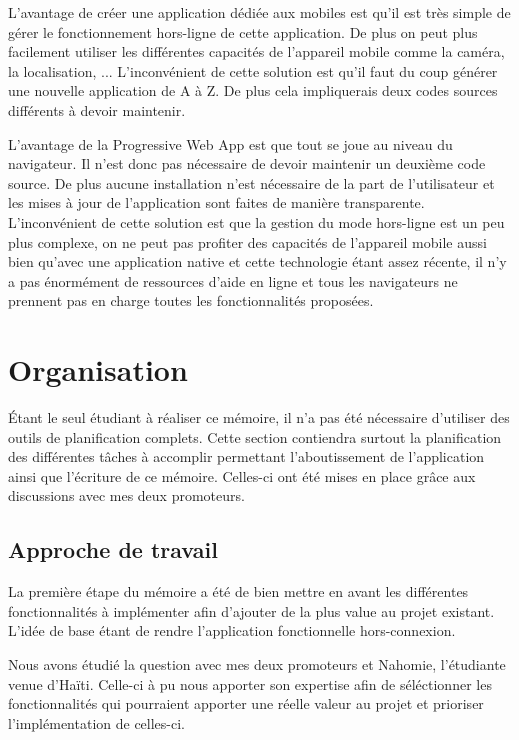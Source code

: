\documentclass{EPL-master-thesis-covers-FR}
\begin{document}
			L'avantage de créer une application dédiée aux mobiles est qu'il est très simple de gérer le fonctionnement hors-ligne de cette application. De plus on peut plus facilement utiliser les différentes capacités de l'appareil mobile comme la caméra, la localisation, ...
			L'inconvénient de cette solution est qu'il faut du coup générer une nouvelle application de A à Z. De plus cela impliquerais deux codes sources différents à devoir maintenir.
				
			L'avantage de la Progressive Web App est que tout se joue au niveau du navigateur. Il n'est donc pas nécessaire de devoir maintenir un deuxième code source. De plus aucune installation n'est nécessaire de la part de l'utilisateur et les mises à jour de l'application sont faites de manière transparente.
			L'inconvénient de cette solution est que la gestion du mode hors-ligne est un peu plus complexe, on ne peut pas profiter des capacités de l'appareil mobile aussi bien qu'avec une application native et cette technologie étant assez récente, il n'y a pas énormément de ressources d'aide en ligne et tous les navigateurs ne prennent pas en charge toutes les fonctionnalités proposées.
				
		
			
			

	\chapter{Organisation}
		Étant le seul étudiant à réaliser ce mémoire, il n'a pas été nécessaire d'utiliser des outils de planification complets. Cette section contiendra surtout la planification des différentes tâches à accomplir permettant l'aboutissement de l'application ainsi que l'écriture de ce mémoire. Celles-ci ont été mises en place grâce aux discussions avec mes deux promoteurs. 

		\section{Approche de travail}
			La première étape du mémoire a été de bien mettre en avant les différentes fonctionnalités à implémenter afin d'ajouter de la plus value au projet existant. L'idée de base étant de rendre l'application fonctionnelle hors-connexion.	
			
			Nous avons étudié la question avec mes deux promoteurs et Nahomie, l'étudiante venue d'Haïti. Celle-ci à pu nous apporter son expertise afin de séléctionner les fonctionnalités qui pourraient apporter une réelle valeur au projet et prioriser l'implémentation de celles-ci.
		
\end{document}
